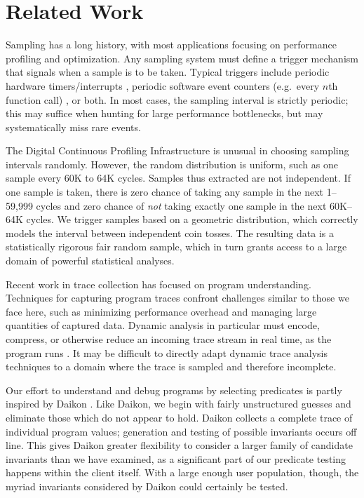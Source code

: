 \section{Related Work}
\label{sec:related-work}

Sampling has a long history, with most applications focusing on
performance profiling and optimization.  Any sampling system must
define a trigger mechanism that signals when a sample is to be taken.
Typical triggers include periodic hardware timers/interrupts
\cite{Burrows:2000:EFV,Traub:200:EILPP,Whaley:337483}, periodic
software event counters (e.g.\ every $n$th function call)
\cite{Arnold:2000:ACCTS}, or both.  In most cases, the sampling
interval is strictly periodic; this may suffice when hunting for large
performance bottlenecks, but may systematically miss rare events.

The Digital Continuous Profiling Infrastructure
\cite{Anderson:1997:CPW} is unusual in choosing sampling intervals
randomly.  However, the random distribution is uniform, such as one
sample every 60K to 64K cycles.  Samples thus extracted are not
independent.  If one sample is taken, there is zero chance of taking
any sample in the next 1--59,999 cycles and zero chance of \emph{not}
taking exactly one sample in the next 60K--64K cycles.  We trigger
samples based on a geometric distribution, which correctly models the
interval between independent coin tosses.  The resulting data is a
statistically rigorous fair random sample, which in turn grants access
to a large domain of powerful statistical analyses.

Recent work in trace collection has focused on program understanding.
Techniques for capturing program traces confront challenges similar to
those we face here, such as minimizing performance overhead and
managing large quantities of captured data.  Dynamic analysis in
particular must encode, compress, or otherwise reduce an incoming
trace stream in real time, as the program runs
\cite{Demsky:RBEOOP:2002,ICSE01*221}.  It may be difficult to directly
adapt dynamic trace analysis techniques to a domain where the trace is
sampled and therefore incomplete.  

Our effort to understand and debug programs by selecting predicates is
partly inspired by Daikon \cite{ernst2001}.  Like Daikon, we begin
with fairly unstructured guesses and eliminate those which do not
appear to hold.  Daikon collects a complete trace of individual
program values; generation and testing of possible invariants occurs
off line.  This gives Daikon greater flexibility to consider a
larger family of candidate invariants than we have examined, as a
significant part of our predicate testing happens within the client
itself.  With a large enough user population, though, the myriad
invariants considered by Daikon could certainly be tested.

